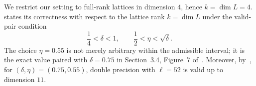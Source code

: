 
\begin{remark}
We restrict our setting to full-rank lattices in dimension $4$, hence
$k=\dim L=4$.
\cite[Figure~9, Theorem~10]{NS09} states its correctness with respect to the lattice rank $k=\dim L$ under the valid-pair condition
\[
  \frac14 < \delta < 1,
  \qquad
  \frac12 < \eta < \sqrt{\delta}.
\]
The choice $\eta=0.55$ is not merely arbitrary within the admissible interval; it is the exact value paired with $\delta=0.75$ in Section~3.4, Figure~7 of~\cite{NS09}.
Moreover, by~\cite[Figure~7]{NS09}, for $(\delta,\eta)=(0.75,0.55)$, double precision with $\ell=52$ is valid up to dimension $11$.
\end{remark}


